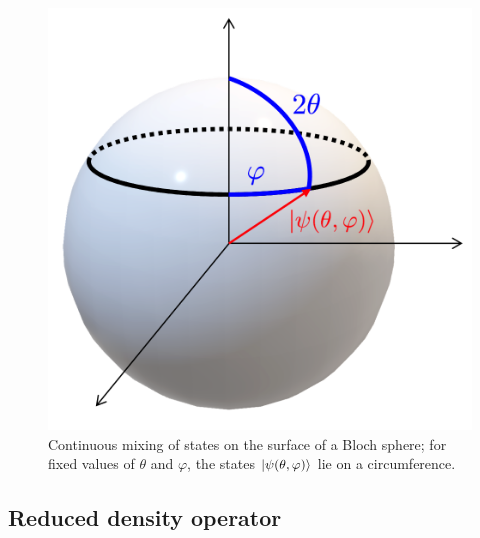 \begin{figure}[H]
\centering
\includegraphics[width=0.45\linewidth]{images/Mixing_states_2.png}
    \caption{Continuous mixing of states on the surface of a Bloch sphere; for fixed values of $\theta$ and $\varphi$, the states $\ket{\psi(\theta,\varphi)}$ lie on a circumference.}
    \label{fig:mix_states2}
\end{figure}

\subsection{Reduced density operator}

